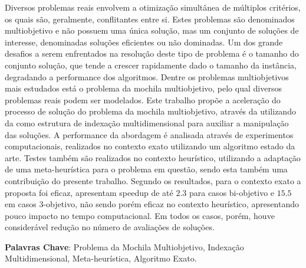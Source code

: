 

\begin{resumo}
Diversos problemas reais envolvem a otimização simultânea de múltiplos critérios,
os quais são, geralmente, conflitantes entre si.
Estes problemas são denominados multiobjetivo e
não possuem uma única solução, mas um conjunto de soluções de interesse, denominadas soluções
eficientes ou não dominadas.
Um dos grande desafios a serem enfrentados na resolução deste tipo de problema é o
tamanho do conjunto solução, que tende a crescer rapidamente dado o tamanho da instância,
degradando a performance dos algoritmos.
Dentre os problemas multiobjetivos mais estudados está o problema da mochila multiobjetivo,
pelo qual diversos problemas reais podem ser modelados.
Este trabalho propõe a aceleração do processo de solução do problema da mochila multiobjetivo,
através da utilizando da \kdtree{} como estrutura de indexação multidimensional
para auxiliar a manipulação das soluções.
A performance da abordagem é analisada através de experimentos
computacionais, realizados no contexto exato utilizando um algoritmo estado da arte.
Testes também são realizados no contexto heurístico, utilizando a adaptação
de uma meta-heurística para o problema em questão, sendo esta também uma contribuição do presente trabalho.
Segundo os resultados, para o contexto exato a proposta foi eficaz, apresentam speedup de até $2.3$
para casos bi-objetivo e $15.5$ em casos 3-objetivo, não sendo porém
eficaz no contexto heurístico, apresentando pouco impacto no tempo computacional.
Em todos os casos, porém, houve considerável redução no número de avaliações de soluções.

\vspace{\onelineskip}

\noindent
\textbf{Palavras Chave}:
Problema da Mochila Multiobjetivo,
Indexação Multidimensional,
Meta-heurística,
Algoritmo Exato.
\end{resumo}



